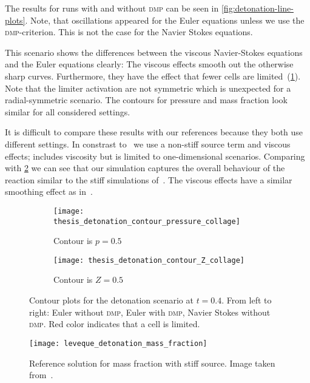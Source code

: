 The results for runs with and without \textsc{dmp} can be seen in \cref{fig:detonation-line-plots}.
Note, that oscillations appeared for the Euler equations unless we use the \textsc{dmp}-criterion.
This is not the case for the Navier Stokes equations.

This scenario shows the differences between the viscous Navier-Stokes equations and the Euler equations clearly:
The viscous effects smooth out the otherwise sharp curves.
Furthermore, they have the effect that fewer cells are limited~(\cref{fig:detonation-pressure-contour}).
Note that the limiter activation are not symmetric which is unexpected for a radial-symmetric scenario.
The contours for pressure and mass fraction look similar for all considered settings.

It is difficult to compare these results with our references because they both use different settings.
In constrast to~\cite{helzel2000modified} we use a non-stiff source term and viscous effects; \cite{hidalgo2011ader} includes viscosity but is limited to one-dimensional scenarios.
Comparing with \cref{fig:detonation-contour-reference} we can see that our simulation captures the overall behaviour of the reaction similar to the stiff simulations of~\cite{helzel2000modified}.
The viscous effects have a similar smoothing effect as in~\cite{hidalgo2011ader}.

\begin{figure}[htb]
  \centering
  \begin{subfigure}[t]{1.0\textwidth}
    \centering
  \texttt{[image: thesis\_detonation\_contour\_pressure\_collage]} 
  \caption{Contour is $p = 0.5$}
  \end{subfigure}
  \begin{subfigure}[t]{1.0\textwidth}
    \centering
  \texttt{[image: thesis\_detonation\_contour\_Z\_collage]} 
  \caption{Contour is $Z = 0.5$}
  \end{subfigure}
  \caption{\label{fig:detonation-pressure-contour}%
    Contour plots for the detonation scenario at $t=0.4$.
    From left to right: Euler without \textsc{dmp}, Euler with \textsc{dmp}, Navier Stokes without \textsc{dmp}.
    Red color indicates that a cell is limited.
  }
\end{figure}

\begin{figure}[htb]
    \centering
    \texttt{[image: leveque\_detonation\_mass\_fraction]}
    \caption{\label{fig:detonation-contour-reference}Reference solution for mass fraction with stiff source.
      Image taken from~\cite{helzel2000modified}.}
\end{figure}



